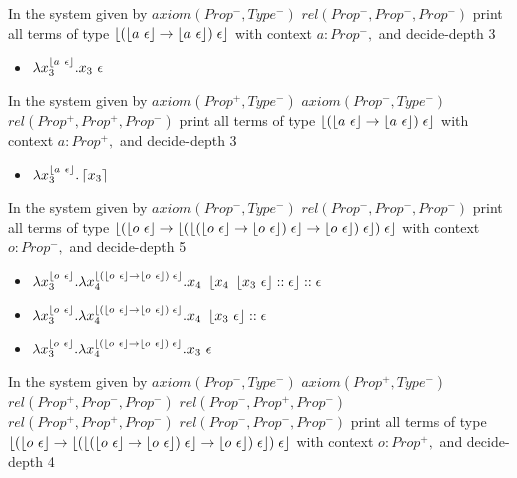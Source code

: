 \documentclass{scrartcl}
\begin{document}
In the system given by $axiom (Prop^-,Type^-)$ $rel (Prop^-,Prop^-,Prop^-)$ print all terms of type $\left \lfloor (\left \lfloor a~\epsilon \right \rfloor \to \left \lfloor a~\epsilon \right \rfloor) \; \epsilon \right \rfloor$ with context ${a:Prop^-,}$ and decide-depth 3
\begin{itemize}
\item $ \lambda x_3^{\left \lfloor a~\epsilon \right \rfloor}.x_3~\epsilon $
\end{itemize}
In the system given by $axiom (Prop^+,Type^-)$ $axiom (Prop^-,Type^-)$ $rel (Prop^+,Prop^+,Prop^-)$ print all terms of type $\left \lfloor (\left \lfloor a~\epsilon \right \rfloor \to \left \lfloor a~\epsilon \right \rfloor) \; \epsilon \right \rfloor$ with context ${a:Prop^+,}$ and decide-depth 3
\begin{itemize}
\item $ \lambda x_3^{\left \lfloor a~\epsilon \right \rfloor}.\left \lceil x_3 \right \rceil $
\end{itemize}
In the system given by $axiom (Prop^-,Type^-)$ $rel (Prop^-,Prop^-,Prop^-)$ print all terms of type $\left \lfloor (\left \lfloor o~\epsilon \right \rfloor \to \left \lfloor (\left \lfloor (\left \lfloor o~\epsilon \right \rfloor \to \left \lfloor o~\epsilon \right \rfloor) \; \epsilon \right \rfloor \to \left \lfloor o~\epsilon \right \rfloor) \; \epsilon \right \rfloor) \; \epsilon \right \rfloor$ with context ${o:Prop^-,}$ and decide-depth 5
\begin{itemize}
\item $ 
 \lambda x_3^{\left \lfloor o~\epsilon \right \rfloor}.\lambda x_4^{\left \lfloor (\left \lfloor o~\epsilon \right \rfloor \to \left \lfloor o~\epsilon \right \rfloor) \; \epsilon \right \rfloor}.x_4~\left \lfloor x_4~\left \lfloor x_3~\epsilon \right \rfloor :: \epsilon \right \rfloor :: \epsilon 
 $
\item $ 
 \lambda x_3^{\left \lfloor o~\epsilon \right \rfloor}.\lambda x_4^{\left \lfloor (\left \lfloor o~\epsilon \right \rfloor \to \left \lfloor o~\epsilon \right \rfloor) \; \epsilon \right \rfloor}.x_4~\left \lfloor x_3~\epsilon \right \rfloor :: \epsilon 
 $
\item $ 
 \lambda x_3^{\left \lfloor o~\epsilon \right \rfloor}.\lambda x_4^{\left \lfloor (\left \lfloor o~\epsilon \right \rfloor \to \left \lfloor o~\epsilon \right \rfloor) \; \epsilon \right \rfloor}.x_3~\epsilon 
 $
\end{itemize}
In the system given by $axiom (Prop^-,Type^-)$ $axiom (Prop^+,Type^-)$ $rel (Prop^+,Prop^-,Prop^-)$ $rel (Prop^-,Prop^+,Prop^-)$ $rel (Prop^+,Prop^+,Prop^-)$ $rel (Prop^-,Prop^-,Prop^-)$ print all terms of type $\left \lfloor (\left \lfloor o~\epsilon \right \rfloor \to \left \lfloor (\left \lfloor (\left \lfloor o~\epsilon \right \rfloor \to \left \lfloor o~\epsilon \right \rfloor) \; \epsilon \right \rfloor \to \left \lfloor o~\epsilon \right \rfloor) \; \epsilon \right \rfloor) \; \epsilon \right \rfloor$ with context ${o:Prop^+,}$ and decide-depth 4
\end{document}
